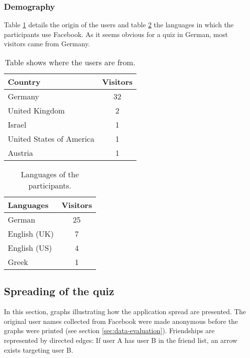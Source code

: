 \documentclass[preprint,12pt]{elsarticle}
\begin{document}
\subsubsection{Demography}
\label{sec:demographie}
Table \ref{tab:countries} details the origin of the users and table
\ref{tab:languages} the languages in which the participants use Facebook.
As it seems obvious for a quiz in German, most visitors came from Germany.

\begin{center}
\begin{table}
\label{tab:countries}
\begin{tabular}{l | c }
Country  & Visitors \\
\hline
Germany  & 32 \\
United Kingdom & 2 \\
Israel & 1 \\
United States of America & 1 \\
Austria & 1 \\
\end{tabular}
\caption{Table shows where the users are from.}
\end{table}
\end{center}

\begin{center}
\begin{table}
\label{tab:languages}
\begin{tabular}{l | c }
Languages   & Visitors \\
\hline
German  & 25 \\
English (UK) & 7 \\
English (US) & 4 \\
Greek  & 1 \\
\end{tabular}
\caption{Languages of the participants.}
\end{table}
\end{center}


\subsection{Spreading of the quiz}
\label{sec:distribution-quiz}
In this section, graphs illustrating how the
application spread are presented. The original user names collected from Facebook were made anonymous
before the graphs were printed (see section \ref{sec:data-evaluation}). Friendships are
represented by directed edges: If user A has user B in the friend list, an
arrow exists targeting user B.
\end{document}
